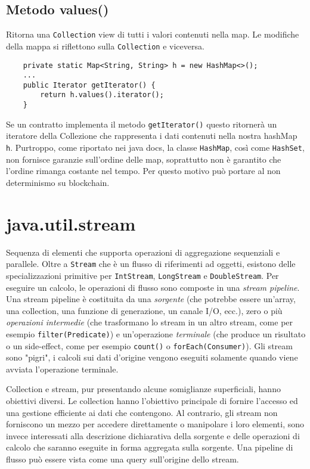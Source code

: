 		\subsection{Metodo values()}
			Ritorna una \lstinline|Collection| view di tutti i valori contenuti nella map. Le modifiche della mappa si riflettono sulla  \lstinline|Collection| e viceversa.
			\begin{lstlisting}
	private static Map<String, String> h = new HashMap<>();
	...
	public Iterator getIterator() { 
		return h.values().iterator();
	}
			\end{lstlisting}
			Se un contratto implementa il metodo \lstinline|getIterator()| questo ritornerà un iteratore della Collezione che rappresenta i dati contenuti nella nostra hashMap \lstinline|h|. Purtroppo, come riportato nei java docs, la classe \lstinline|HashMap|, così come \lstinline|HashSet|, non fornisce garanzie sull'ordine delle map, soprattutto non è garantito che l'ordine rimanga costante nel tempo. Per questo motivo può portare al non determinismo su blockchain.
			
	\section{java.util.stream}
		Sequenza di elementi che supporta operazioni di aggregazione sequenziali e parallele. Oltre a \lstinline|Stream| che è un flusso di riferimenti ad oggetti, esistono delle specializzazioni primitive per \lstinline|IntStream|, \lstinline|LongStream| e \lstinline|DoubleStream|. Per eseguire un calcolo, le operazioni di flusso sono composte in una \textit{stream pipeline}. Una stream pipeline è costituita da una \textit{sorgente} (che potrebbe essere un'array, una collection, una funzione di generazione, un canale I/O, ecc.), zero o più \textit{operazioni intermedie} (che trasformano lo stream in un altro stream, come per esempio \lstinline|filter(Predicate)|) e un'operazione \textit{terminale} (che produce un risultato o un side-effect, come per esempio \lstinline|count()| o \lstinline|forEach(Consumer)|). Gli stream sono "pigri", i calcoli sui dati d'origine vengono eseguiti solamente quando viene avviata l'operazione terminale.
		
		Collection e stream, pur presentando alcune somiglianze superficiali, hanno obiettivi diversi. Le collection hanno l'obiettivo principale di fornire l'accesso ed una gestione efficiente ai dati che contengono. Al contrario, gli stream non forniscono un mezzo per accedere direttamente o manipolare i loro elementi, sono invece interessati alla descrizione dichiarativa della sorgente e delle operazioni di calcolo che saranno eseguite in forma aggregata sulla sorgente.	Una pipeline di flusso può essere vista come una query sull'origine dello stream.
		
